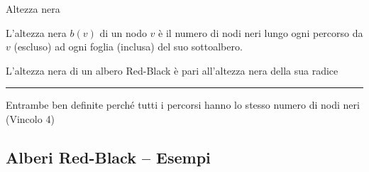 \begin{frame}{Altezza nera}

\vspace{-9pt}
\begin{myboxtitle}
L'\alert{altezza nera $b(v)$ di un nodo $v$} è il numero di nodi neri lungo ogni percorso da $v$ (escluso) ad ogni foglia (inclusa) del suo sottoalbero.
\end{myboxtitle}

\begin{myboxtitle}
L'\alert{altezza nera di un albero Red-Black} è pari all'altezza nera della sua radice
\end{myboxtitle}


\vspace{48pt}
\hrule

\vspace{6pt}
Entrambe ben definite perché tutti i percorsi hanno lo stesso numero di nodi neri (Vincolo 4)

\end{frame}

\subsection{Alberi Red-Black -- Esempi}

